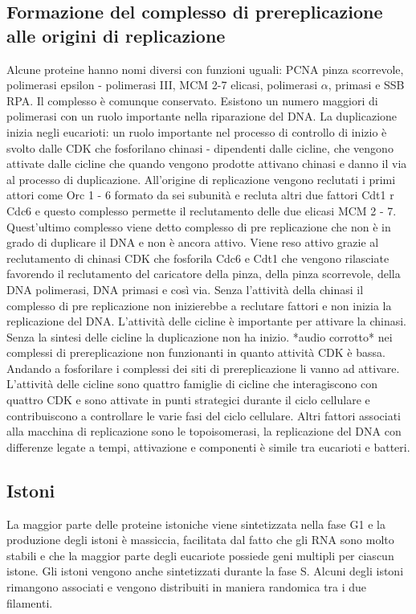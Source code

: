 \subsection{Formazione del complesso di prereplicazione alle origini di replicazione}
Alcune proteine hanno nomi diversi con funzioni uguali: PCNA pinza scorrevole, polimerasi epsilon - polimerasi III, MCM 2-7 elicasi, polimerasi $\alpha$, primasi e SSB RPA. Il complesso
\`e comunque conservato. Esistono un numero maggiori di polimerasi con un ruolo importante nella riparazione del DNA. La duplicazione inizia negli eucarioti: un ruolo importante nel
processo di controllo di inizio \`e svolto dalle CDK che fosforilano chinasi - dipendenti dalle cicline, che vengono attivate dalle cicline che quando vengono prodotte attivano chinasi
e danno il via al processo di duplicazione. All'origine di replicazione vengono reclutati i primi attori come Orc 1 - 6 formato da sei subunit\`a e recluta altri due fattori Cdt1 r 
Cdc6 e questo complesso permette il reclutamento delle due elicasi MCM 2 - 7. Quest'ultimo complesso viene detto complesso di pre replicazione che non \`e in grado di duplicare il DNA
e non \`e ancora attivo. Viene reso attivo grazie al reclutamento di chinasi CDK che fosforila Cdc6 e Cdt1 che vengono rilasciate favorendo il reclutamento del caricatore della pinza, 
della pinza scorrevole, della DNA polimerasi, DNA primasi e cos\`i via. Senza l'attivit\`a della chinasi il complesso di pre replicazione non inizierebbe a reclutare fattori e non 
inizia la replicazione del DNA. L'attivit\`a delle cicline \`e importante per attivare la chinasi. Senza la sintesi delle cicline la duplicazione non ha inizio.  *audio corrotto* nei 
complessi di prereplicazione non funzionanti in quanto attivit\`a CDK \`e bassa. Andando a fosforilare i complessi dei siti di prereplicazione li vanno ad attivare. L'attivit\`a delle
cicline sono quattro famiglie di cicline che interagiscono con quattro CDK e sono attivate in punti strategici durante il ciclo cellulare e contribuiscono a controllare le varie fasi del
ciclo cellulare. Altri fattori associati alla macchina di replicazione sono le topoisomerasi, la replicazione del DNA con differenze legate a tempi, attivazione e componenti \`e 
simile tra eucarioti e batteri. 
\subsection{Istoni}
La maggior parte delle proteine istoniche viene sintetizzata nella fase G1 e la produzione degli istoni \`e massiccia, facilitata dal fatto che gli RNA sono molto stabili e che la 
maggior parte degli eucariote possiede geni multipli per ciascun istone. Gli istoni vengono anche sintetizzati durante la fase S. Alcuni degli istoni rimangono associati e vengono 
distribuiti in maniera randomica tra i due filamenti. 
